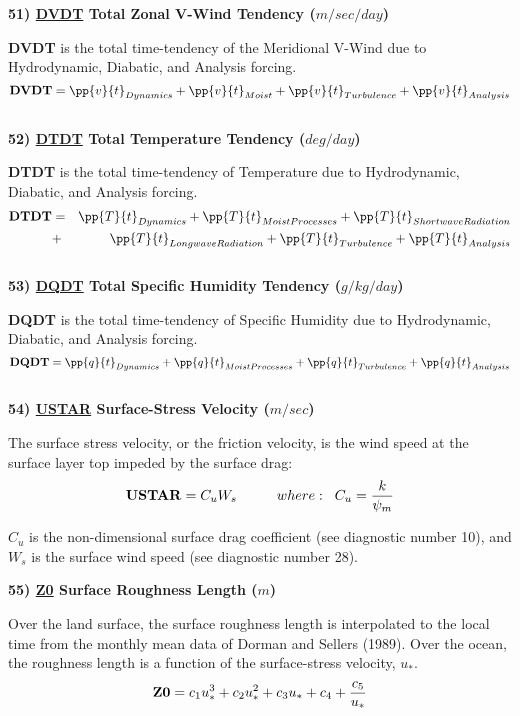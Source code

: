 \noindent
{\bf 51)  \underline {DVDT} Total Zonal V-Wind Tendency  ($m/sec/day$) }

\noindent
{\bf DVDT} is the total time-tendency of the Meridional V-Wind due to Hydrodynamic, Diabatic,
and Analysis forcing.
\[
{\bf DVDT} = \pp{v}{t}_{Dynamics} + \pp{v}{t}_{Moist} + \pp{v}{t}_{Turbulence} + \pp{v}{t}_{Analysis} 
\]
\\

\noindent
{\bf 52)  \underline {DTDT} Total Temperature Tendency  ($deg/day$) }

\noindent
{\bf DTDT} is the total time-tendency of Temperature due to Hydrodynamic, Diabatic,
and Analysis forcing.
\begin{eqnarray*}
{\bf DTDT} & = & \pp{T}{t}_{Dynamics} + \pp{T}{t}_{Moist Processes} + \pp{T}{t}_{Shortwave Radiation} \\
           & + & \pp{T}{t}_{Longwave Radiation} + \pp{T}{t}_{Turbulence} + \pp{T}{t}_{Analysis} 
\end{eqnarray*}
\\

\noindent
{\bf 53)  \underline {DQDT} Total Specific Humidity Tendency  ($g/kg/day$) }

\noindent
{\bf DQDT} is the total time-tendency of Specific Humidity due to Hydrodynamic, Diabatic,
and Analysis forcing.
\[
{\bf DQDT} = \pp{q}{t}_{Dynamics} + \pp{q}{t}_{Moist Processes} 
+ \pp{q}{t}_{Turbulence} + \pp{q}{t}_{Analysis} 
\]
\\
   
\noindent
{\bf 54)  \underline {USTAR}  Surface-Stress Velocity ($m/sec$) }

\noindent
The surface stress velocity, or the friction velocity, is the wind speed at 
the surface layer top impeded by the surface drag:
\[
{\bf USTAR} = C_uW_s \hspace{1cm}where: \hspace{.2cm} 
C_u = {k \over {\psi_m} }
\]

\noindent
$C_u$ is the non-dimensional surface drag coefficient (see diagnostic
number 10), and $W_s$ is the surface wind speed (see diagnostic number 28).
 
\noindent
{\bf 55)  \underline {Z0}  Surface Roughness Length ($m$) }

\noindent
Over the land surface, the surface roughness length is interpolated to the local
time from the monthly mean data of Dorman and Sellers (1989). Over the ocean,
the roughness length is a function of the surface-stress velocity, $u_*$.
\[
{\bf Z0} = c_1u^3_* + c_2u^2_* + c_3u_* + c_4 + {c_5 \over {u_*}}
\]

